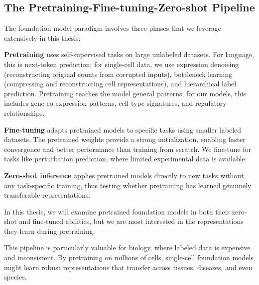 \subsection{The Pretraining-Fine-tuning-Zero-shot Pipeline}
The foundation model paradigm involves three phases that we leverage extensively in this thesis:

\textbf{Pretraining} uses self-supervised tasks on large unlabeled datasets. For language, this is next-token prediction; for single-cell data, we use expression denoising (reconstructing original counts from corrupted inputs), bottleneck learning (compressing and reconstructing cell representations), and hierarchical label prediction. Pretraining teaches the model general patterns; for our models, this includes gene co-expression patterns, cell-type signatures, and regulatory relationships.

\textbf{Fine-tuning} adapts pretrained models to specific tasks using smaller labeled datasets. The pretrained weights provide a strong initialization, enabling faster convergence and better performance than training from scratch. We fine-tune for tasks like perturbation prediction, where limited experimental data is available.

\textbf{Zero-shot inference} applies pretrained models directly to new tasks without any task-specific training, thus testing whether pretraining has learned genuinely transferable representations.

In this thesis, we will examine pretrained foundation models in both their zero-shot and fine-tuned abilities, but we are most interested in the representations they learn during pretraining.

This pipeline is particularly valuable for biology, where labeled data is expensive and inconsistent. By pretraining on millions of cells, single-cell foundation models might learn robust representations that transfer across tissues, diseases, and even species.